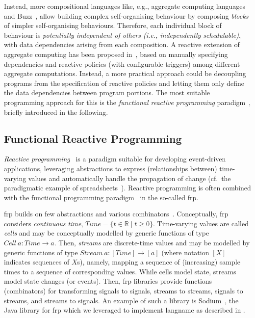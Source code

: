  Instead, more compositional languages like, e.g., aggregate computing languages~\cite{aggregatecomputing,DBLP:journals/nca/BachrachBM10,DBLP:conf/ecoop/AudritoCDSV22} and Buzz~\cite{DBLP:conf/iros/PinciroliB16},
 allow building complex self-organising behaviour
 by composing \emph{blocks} of simpler self-organising behaviours.
Therefore, each individual block of behaviour 
  is \emph{potentially independent of others (i.e., independently schedulable)},
  with data dependencies arising from each composition.
%
A reactive extension of aggregate computing has been proposed in~\cite{DBLP:journals/lmcs/PianiniCVMZ21},
  based on manually specifying dependencies and reactive policies (with configurable triggers) among different aggregate computations.
%
Instead,
 a more practical approach could be
 decoupling programs from the specification of reactive policies
 and letting them only define the data dependencies between program portions.
%
The most suitable programming approach for this
 is the \emph{functional reactive programming} paradigm~\cite{DBLP:journals/csur/BainomugishaCCMM13}, briefly introduced in the following.
%
\subsection{Functional Reactive Programming}
\label{acsos2023-frp:sec:background:frp}

\emph{Reactive programming}~\cite{DBLP:journals/csur/BainomugishaCCMM13} 
 is a paradigm suitable for developing event-driven applications,
 leveraging abstractions to express (relationships between) 
 time-varying values and automatically handle the propagation of change
(cf.\ the paradigmatic example of spreadsheets~\cite{blackheath2016frp-sodium}).
%
Reactive programming is often combined with the functional programming paradigm~\cite{DBLP:journals/csur/BainomugishaCCMM13,blackheath2016frp-sodium}
in the so-called \ac{frp}.

\newcommand{\Time}{\ensuremath{\mathit{Time}}}
\newcommand{\Sg}{\ensuremath{\mathit{Cell}}}
\newcommand{\St}{\ensuremath{\mathit{Stream}}}

\Ac{frp} builds on few abstractions and various combinators~\cite{DBLP:conf/pldi/WanH00}.
%
Conceptually,
\ac{frp} considers \emph{continuous time}, $\Time = \{ t \in \mathbb{R} \mid t \geq 0 \}$.
%
Time-varying values are called \emph{cells}
 and may be conceptually modelled by generic functions of type $\Sg\:a: \Time \to a$.
%
Then, \emph{streams} are discrete-time values
 and may be modelled by generic functions of type
$\St\:a: [\Time] \to [a]$ (where notation $[X]$ indicates sequences of $X$s), namely, 
mapping a sequence of (increasing) sample times to a sequence of corresponding values.
%
While cells model state,
 streams model state changes (or events).
%
Then, \ac{frp} libraries %
 provide functions (combinators) for transforming signals to signals,
  streams to streams,
  signals to streams,
  and streams to signals.
%
An example of such a library %
 is Sodium~\cite{blackheath2016frp-sodium},
 the Java library for \ac{frp}
 which we leveraged to implement \ac{langname} as described in .
  
